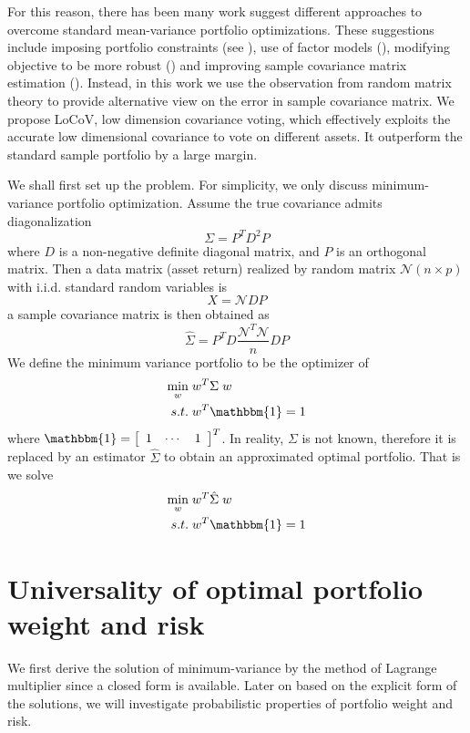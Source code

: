 \documentclass[12pt]{extarticle}
\newcommand{\cN}{{\mathcal{N}}}
\newcommand{\1}{\mathbbm{1}}
\newcommand{\mat}[2][rrrrrrrrrrrrrrrrrrrrrrrrrrrrrrrr]{\left[ \begin{array}{#1} #2 \\ \end{array}\right]}
\numberwithin{equation}{section}
\begin{document}
For this reason, there has been many work suggest different approaches to overcome standard mean-variance portfolio optimizations.  These suggestions include  imposing portfolio constraints (see \cite{jagannathan2003risk, demiguel2009generalized, behr2013portfolio}), use of factor models (\cite{chan1999portfolio}),  modifying objective to be more robust  (\cite{demiguel2009portfolio}) and improving sample covariance matrix estimation (\cite{ledoit2003improved}). Instead, in this work we use the observation from random matrix theory to provide alternative view on the error in sample covariance matrix. We propose LoCoV, low dimension covariance voting, which effectively exploits the accurate low dimensional covariance to vote on different assets. It outperform the standard sample portfolio by a large margin.

We shall first set up the problem. For simplicity, we only discuss minimum-variance portfolio optimization. Assume the true covariance admits diagonalization 
\[
\Sigma = P^T D^2 P
\]
where $D$ is a non-negative definite diagonal matrix, and $P$ is an orthogonal matrix. Then a data matrix (asset return) realized by random matrix $\cN (n\times p)$ with i.i.d. standard random variables is 
\[
X = \cN D P
\]
a sample covariance matrix is then obtained as 
\[
\hat{\Sigma} = P^TD\frac{\cN^T \cN}{n} DP
\]
We define the minimum variance portfolio to be the optimizer of 
\begin{equation}\label{eqn:true portfolio optimization}
    \begin{split}
		\min_w \;& w^T \Sigma \; w \\
		s.t. \;&  w^T \mathbbm{1} =1
    \end{split} 
\end{equation}
where $\mathbbm{1}= \mat[ccc]{1 & \cdots & 1}^T$. In reality, $\Sigma$ is not known, therefore it is replaced by an estimator $\hat{\Sigma}$ to obtain an approximated optimal portfolio. That is we solve
\begin{equation}\label{eqn:sample portfolio optimization}
\begin{split}
		\min_w \;& w^T \hat{\Sigma}\; w \\
		s.t. \;&  w^T \mathbbm{1} =1
\end{split} 
\end{equation}


\section{Universality of optimal portfolio weight and risk}
We first derive the solution of minimum-variance by the method of Lagrange multiplier since a closed form is available. Later on based on the explicit form of the solutions, we will investigate probabilistic properties of portfolio weight and risk.
\end{document}
